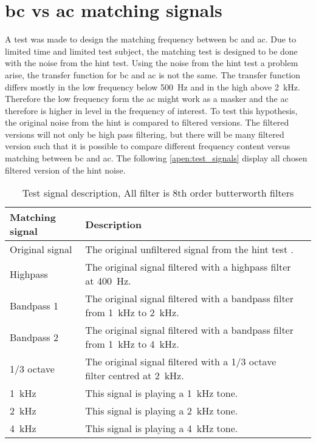 \chapter*{\gls{bc} vs \gls{ac} matching signals}
A test was made to design the matching frequency between \gls{bc} and \gls{ac}. Due to limited time and limited test subject, the matching test is designed to be done with the noise from the \gls{hint} test. Using the noise from the \gls{hint} test a problem arise, the transfer function for \gls{bc} and \gls{ac} is not the same. The transfer function differs mostly in the low frequency below \SI{500}{\hertz} and in the high above \SI{2}{\kilo\hertz}. Therefore the low frequency form the \gls{ac} might work as a masker and the \gls{ac} therefore is higher in level in the frequency of interest. To test this hypothesis, the original noise from the \gls{hint} is compared to filtered versions. The filtered versions will not only be high pass filtering, but there will be many filtered version such that it is possible to compare different frequency content versus matching between \gls{bc} and \gls{ac}. The following \autoref{apen:test_signals} display all chosen filtered version of the \gls{hint} noise. 


\begin{table}[H]
\caption{Test signal description, All filter is 8th order butterworth filters}
\begin{tabularx}{\textwidth}{l | X l}
Matching signal       & Description \\ \hline
Original signal         & The original unfiltered signal from the \gls{hint} test \citep{hint_2011}.      \\
Highpass        & The original signal filtered with a highpass filter at \SI{400}{\hertz}.           \\
Bandpass 1        & The original signal filtered with a bandpass filter from \SI{1}{\kilo\hertz} to \SI{2}{\kilo\hertz}.           \\
Bandpass 2        & The original signal filtered with a bandpass filter from \SI{1}{\kilo\hertz} to \SI{4}{\kilo\hertz}.          \\
1/3 octave & The original signal filtered with a 1/3 octave filter centred at \SI{2}{\kilo\hertz}.          \\
\SI{1}{\kilo\hertz}                  & This signal is playing a \SI{1}{\kilo\hertz} tone.      \\
\SI{2}{\kilo\hertz}                 & This signal is playing a \SI{2}{\kilo\hertz} tone.          \\
\SI{4}{\kilo\hertz}                 & This signal is playing a \SI{4}{\kilo\hertz} tone.        
\end{tabularx}
\label{apen:test_signals}
\end{table}

